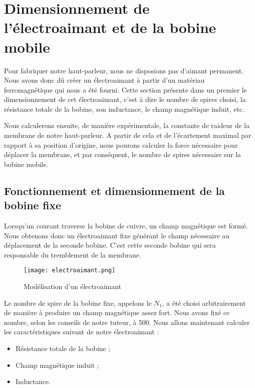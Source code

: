 

\section{Dimensionnement de l'électroaimant et de la bobine mobile}
Pour fabriquer notre haut-parleur, nous ne disposions pas d'aimant permanent. Nous avons donc
dû créer un électroaimant à partir d'un matériau ferromagnétique qui nous a été fourni.
Cette section présente dans un premier le dimensionnement de cet électroaimant, c'est à dire le
nombre de spires choisi, la résistance totale de la bobine, son inductance, le champ magnétique
induit, etc.

Nous calculerons ensuite, de manière expérimentale, la constante de raideur de la membrane de
notre haut-parleur. A partir de cela et de l'écartement maximal par rapport à sa position d'origine, 
nous pourons calculer la force nécessaire pour déplacer la membrane, et par conséquent, le nombre
de spires nécessaire sur la bobine mobile.

\subsection{Fonctionnement et dimensionnement de la bobine fixe}
Lorsqu'un courant traverse la bobine de cuivre, un champ magnétique est formé.  Nous obtenons 
donc un électroaimant fixe générant le champ nécessaire au déplacement de la seconde bobine. 
C'est cette seconde bobine qui sera responsable du tremblement de la membrane.

\begin{figure}[h]
\centering
\texttt{[image: electroaimant.png]}
\caption{Modélisation d'un électroaimant}
\label{modélisation de l'électroaimant}
\end{figure}

Le nombre de spire de la bobine fixe, appelons le $N_1$, a été choisi arbitrairement de manière à produire un
champ magnétique assez fort. Nous avons fixé ce nombre, selon les conseils de notre tuteur, à 500. 
Nous allons maintenant calculer les caractéristiques suivant de notre électroaimant :

\begin{itemize}
	\item Résistance totale de la bobine ;
	\item Champ magnétique induit ;
	\item Inductance.
\end{itemize}

